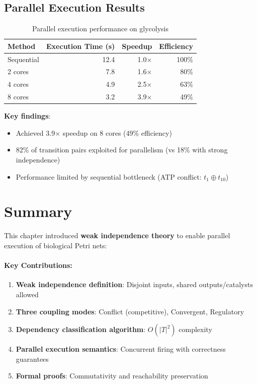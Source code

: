 \subsection{Parallel Execution Results}
\label{subsec:parallel-results}

\begin{table}[htbp]
\centering
\caption{Parallel execution performance on glycolysis}
\label{tab:parallel-performance}
\begin{tabular}{lrrr}
\toprule
\textbf{Method} & \textbf{Execution Time (s)} & \textbf{Speedup} & \textbf{Efficiency} \\
\midrule
Sequential & 12.4 & 1.0$\times$ & 100\% \\
2 cores & 7.8 & 1.6$\times$ & 80\% \\
4 cores & 4.9 & 2.5$\times$ & 63\% \\
8 cores & 3.2 & 3.9$\times$ & 49\% \\
\bottomrule
\end{tabular}
\end{table}

\noindent\textbf{Key findings}:
\begin{itemize}
    \item Achieved 3.9$\times$ speedup on 8 cores (49\% efficiency)
    \item 82\% of transition pairs exploited for parallelism (vs 18\% with strong independence)
    \item Performance limited by sequential bottleneck (ATP conflict: $t_1 \oplus t_{10}$)
\end{itemize}

\section{Summary}
\label{sec:chapter5-summary}

This chapter introduced \textbf{weak independence theory} to enable parallel execution of biological Petri nets:

\paragraph{Key Contributions:}
\begin{enumerate}
    \item \textbf{Weak independence definition}: Disjoint inputs, shared outputs/catalysts allowed
    \item \textbf{Three coupling modes}: Conflict (competitive), Convergent, Regulatory
    \item \textbf{Dependency classification algorithm}: $O(|T|^2)$ complexity
    \item \textbf{Parallel execution semantics}: Concurrent firing with correctness guarantees
    \item \textbf{Formal proofs}: Commutativity and reachability preservation
\end{enumerate}

